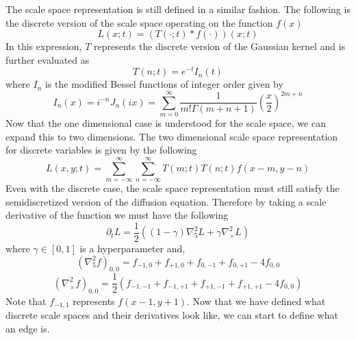 \documentclass{article}
\begin{document}
The scale space representation is still defined in a similar fashion.
The following is the discrete version of the scale space operating on the function $f(x)$
\begin{equation}
  L(x;t) = (T(\cdot;t) * f(\cdot))(x;t)
\end{equation}
In this expression, $T$ represents the discrete version of the Gaussian kernel and is further evaluated as \cite{Lindeberg1993}
\begin{equation}
  T(n;t) = e^{-t}I_n(t)
\end{equation}
where $I_n$ is the modified Bessel functions of integer order given by
\begin{equation}
  I_n(x) = i^{-n}J_{n}(ix) = \sum_{m=0}^{\infty}\frac{1}{m!\Gamma(m+n+1)}\left(\frac{x}{2}\right)^{2m+n}
\end{equation}
Now that the one dimensional case is understood for the scale space, we can expand this to two dimensions.
The two dimensional scale space representation for discrete variables is given by the following
\begin{equation}
  L(x,y;t) = \sum_{m=-\infty}^{\infty}\sum_{n=-\infty}^{\infty}T(m;t)T(n;t)f(x-m,y-n)
\end{equation}
Even with the discrete case, the scale space representation must still satisfy the semidiscretized version of the diffusion equation.
Therefore by taking a scale derivative of the function we must have the following \cite{Lindeberg1993}
\begin{equation}
  \partial_t L = \frac{1}{2}((1-\gamma)\nabla^2_5L+\gamma\nabla^2_\times L)
\end{equation}
where $\gamma \in [0,1]$ is a hyperparameter and,
\begin{equation}
  (\nabla^2_5f)_{0,0} = f_{-1,0} + f_{+1,0} + f_{0,-1} + f_{0,+1} - 4f_{0,0}
\end{equation}
\begin{equation}
  (\nabla^2_\times f)_{0,0} = \frac{1}{2}(f_{-1,-1} + f_{-1,+1} + f_{+1,-1} + f_{+1,+1} - 4f_{0,0})
\end{equation}
Note that $f_{-1,1}$ represents $f(x-1, y+1)$. Now that we have defined what discrete scale spaces and their derivatives look like, we can start to define what an edge is.
\end{document}

